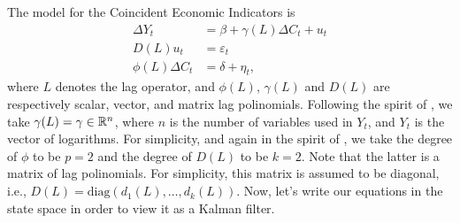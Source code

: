 The model for the Coincident Economic Indicators \cite{stock&watson1989indexes} is
\begin{equation}
	\begin{aligned}
		\Delta Y_t& = \beta + \gamma(L) \Delta C_t + u_t \\
		D(L) u_t &= \varepsilon_t\\
		\phi(L) \Delta  C_t& = \delta + \eta_t,
	\end{aligned}
\end{equation}
where $L$ denotes the lag operator, and $\phi(L)$, $\gamma(L)$ and $D(L)$ are respectively scalar, vector, and matrix lag polinomials. Following the spirit of , we take $\gamma(L) = \gamma\in\mathbb{R}^n$, where $n$ is the number of variables used in $Y_t$, and $Y_t$ is the vector of logarithms. For simplicity, and again in the spirit of , we take the degree of $\phi$ to be $p=2$ and the degree of $D(L)$ to be $k=2$. Note that the latter is a matrix of lag polinomials. For simplicity, this matrix is assumed to be diagonal, i.e., $D(L) = \text{diag}\left(d_1(L),\ldots, d_k(L)\right)$. Now, let's write our equations in the state space in order to view it as a Kalman filter.

